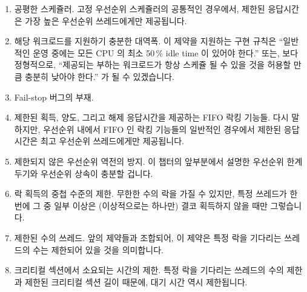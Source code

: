 \begin{enumerate}
\item	공평한 스케쥴러.
	고정 우선순위 스케쥴러의 공통적인 경우에서, 제한된 응답시간은 가장 높은
	우선순위 쓰레드에게만 제공됩니다.
\item	해당 워크로드를 지원하기 충분한 대역폭.
	이 제약을 지원하는 구현 규칙은 ``일반적인 운영 중에는 모든 CPU 의 최소
	50\,\% idle time 이 있어야 한다.'' 또는, 보다 정형적으로, ``제공되는
	부하는 워크로드가 항상 스케쥴 될 수 있을 것을 허용할 만큼 충분히 낮아야
	한다.'' 가 될 수 있겠습니다.
\item	Fail-stop 버그의 부재.
\item	제한된 획득, 양도, 그리고 해제 응답시간을 제공하는 FIFO 락킹 기능들.
	다시 말하지만, 우선순위 내에서 FIFO 인 락킹 기능들의 일반적인 경우에서
	제한된 응답시간은 최고 우선순위 쓰레드에게만 제공됩니다.
\item	제한되지 않은 우선순위 역전의 방지.
	이 챕터의 앞부분에서 설명한 우선순위 한계 두기와 우선순위 상속이 충분할
	겁니다.

\item	락 획득의 중첩 수준의 제한.
	무한한 수의 락을 가질 수 있지만, 특정 쓰레드가 한번에 그 중 일부 이상은
	(이상적으로는 하나만) 결코 획득하지 않을 때만 그렇습니다.
\item	제한된 수의 쓰레드.
	앞의 제약들과 조합되어, 이 제약은 특정 락을 기다리는 쓰레드의 수는
	제한되어 있을 것을 의미합니다.
\item	크리티컬 섹션에서 소요되는 시간의 제한.
	특정 락을 기다리는 쓰레드의 수의 제한과 제한된 크리티컬 섹션 길이
	때문에, 대기 시간 역시 제한됩니다.


\end{enumerate}
